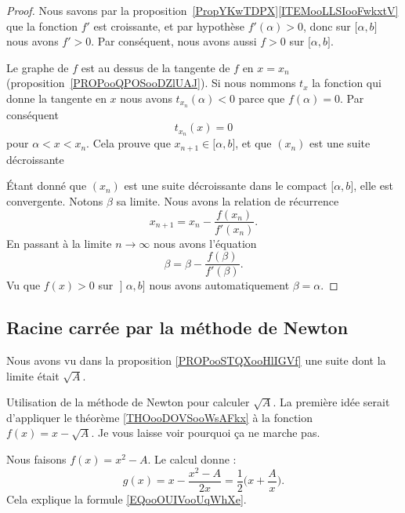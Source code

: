 \begin{proof}
	Nous savons par la proposition~\ref{PropYKwTDPX}\ref{ITEMooLLSIooFwkxtV} que la fonction \( f'\) est croissante, et par hypothèse \( f'(\alpha)>0\), donc sur \( \mathopen[ \alpha , b \mathclose]\) nous avons \( f'>0\). Par conséquent, nous avons aussi \( f>0\) sur \( \mathopen[ \alpha , b \mathclose]\).

	Le graphe de \( f\) est au dessus de la tangente de \( f\) en \( x=x_n\) (proposition~\ref{PROPooQPOSooDZlUAJ}). Si nous nommons \( t_x\) la fonction qui donne la tangente en \( x\) nous avons \( t_{x_n}(\alpha)<0\) parce que \( f(\alpha)=0\). Par conséquent
	\begin{equation}
		t_{x_n}(x)=0
	\end{equation}
	pour \( \alpha<x<x_n\). Cela prouve que \( x_{n+1}\in\mathopen[ \alpha , b \mathclose]\), et que \( (x_n)\) est une suite décroissante

	Étant donné que \( (x_n)\) est une suite décroissante dans le compact \( \mathopen[ \alpha , b \mathclose]\), elle est convergente. Notons \( \beta\) sa limite. Nous avons la relation de récurrence
	\begin{equation}
		x_{n+1}=x_n-\frac{ f(x_n) }{ f'(x_n) }.
	\end{equation}
	En passant à la limite \( n\to \infty\) nous avons l'équation
	\begin{equation}
		\beta=\beta-\frac{ f(\beta) }{ f'(\beta) }.
	\end{equation}
	Vu que \( f(x)>0\) sur \( \mathopen] \alpha , b \mathclose]\) nous avons automatiquement \( \beta=\alpha\).
\end{proof}

\subsection{Racine carrée par la méthode de Newton}

Nous avons vu dans la proposition \ref{PROPooSTQXooHlIGVf} une suite dont la limite était \( \sqrt{ A }\).

\begin{example}\label{EXooDLSVooMHPpcl}
	Utilisation de la méthode de Newton pour calculer \( \sqrt{ A }\). La première idée serait d'appliquer le théorème \ref{THOooDOVSooWsAFkx} à la fonction \( f(x)=x-\sqrt{ A }\). Je vous laisse voir pourquoi ça ne marche pas.

	Nous faisons \( f(x)=x^2-A\). Le calcul donne :
	\begin{equation}
		g(x)=x-\frac{ x^2-A }{ 2x }=\frac{ 1 }{2}\big( x+\frac{ A }{ x } \big).
	\end{equation}
	Cela explique la formule \eqref{EQooOUIVooUqWhXe}.
\end{example}


